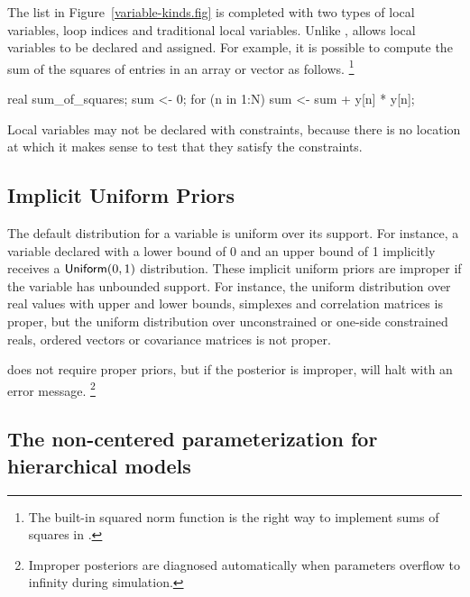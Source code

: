 \documentclass[article]{jss}
\begin{document}
The list in Figure~\ref{variable-kinds.fig} is completed with two
types of local variables, loop indices and traditional local
variables.  Unlike ,  allows local
variables to be declared and assigned.  For example, it is possible to
compute the sum of the squares of entries in an array or vector
 as follows.%
%
\footnote{The built-in squared norm function is the right way to
  implement sums of squares in .}
%
\begin{Code}
{ 
  real sum_of_squares;
  sum <- 0;
  for (n in 1:N)
    sum <- sum + y[n] * y[n];
}  
\end{Code}
%
Local variables may not be declared with constraints, because there is
no location at which it makes sense to test that they satisfy the
constraints. 


\subsection{Implicit Uniform Priors}\label{implicit-prior.section}

The default distribution for a variable is uniform over its support.
For instance, a variable declared with a lower bound of 0 and an upper
bound of 1 implicitly receives a $\mbox{\sf Uniform}(0,1)$
distribution.  These implicit uniform priors are improper if the
variable has unbounded support.  For instance, the uniform
distribution over real values with upper and lower bounds, simplexes
and correlation matrices is proper, but the uniform distribution over
unconstrained or one-side constrained reals, ordered vectors or
covariance matrices is not proper.

 does not require proper priors, but if the posterior
is improper,  will halt with an error message.%
%
\footnote{Improper posteriors are diagnosed automatically when
  parameters overflow to infinity during simulation.}


\subsection{The non-centered parameterization for hierarchical models}
\end{document}

